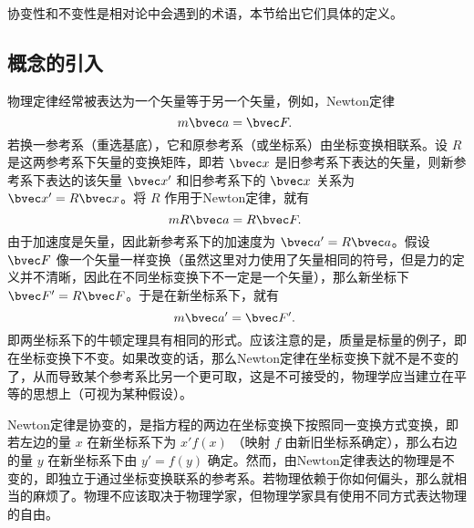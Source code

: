 
协变性和不变性是相对论中会遇到的术语，本节给出它们具体的定义。
\subsection{概念的引入}
物理定律经常被表达为一个矢量等于另一个矢量，例如，Newton定律 
\begin{equation}
m\bvec a=\bvec F.~
\end{equation}
若换一参考系（重选基底），它和原参考系（或坐标系）由坐标变换相联系。设 $R$ 是这两参考系下矢量的变换矩阵，即若 $\bvec x$ 是旧参考系下表达的矢量，则新参考系下表达的该矢量 $\bvec x'$ 和旧参考系下的 $\bvec x$ 关系为 $\bvec x'=R\bvec x$。将 $R$ 作用于Newton定律，就有
\begin{equation}
mR\bvec a=R\bvec F.~
\end{equation}
由于加速度是矢量，因此新参考系下的加速度为 $\bvec a'=R\bvec a$。假设 $\bvec F$ 像一个矢量一样变换（虽然这里对力使用了矢量相同的符号，但是力的定义并不清晰，因此在不同坐标变换下不一定是一个矢量），那么新坐标下 $\bvec F'=R\bvec F$。于是在新坐标系下，就有
\begin{equation}
m\bvec a'=\bvec F'.~
\end{equation}
即两坐标系下的牛顿定理具有相同的形式。应该注意的是，质量是标量的例子，即在坐标变换下不变。如果改变的话，那么Newton定律在坐标变换下就不是不变的了，从而导致某个参考系比另一个更可取，这是不可接受的，物理学应当建立在平等的思想上（可视为某种假设）。

Newton定律是协变的，是指方程的两边在坐标变换下按照同一变换方式变换，即若左边的量 $x$ 在新坐标系下为 $x'f(x)$ （映射 $f$ 由新旧坐标系确定），那么右边的量 $y$ 在新坐标系下由 $y'=f(y)$ 确定。然而，由Newton定律表达的物理是不变的，即独立于通过坐标变换联系的参考系。若物理依赖于你如何偏头，那么就相当的麻烦了。物理不应该取决于物理学家，但物理学家具有使用不同方式表达物理的自由。

